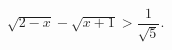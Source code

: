 \begin{ex}[type=inequality]
	\begin{condition}
		$\sqrt{2 - x} - \sqrt{x+ 1}>\dfrac{1}{\sqrt{5}} .$
	\end{condition}
\end{ex}